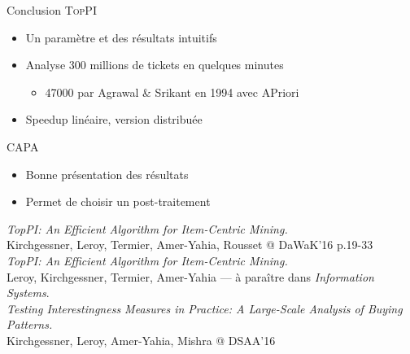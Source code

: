 \documentclass[table]{beamer}
\providecommand{\toppi}{\mbox{\textsc{TopPI}}}
\providecommand{\capa}{\mbox{\textsc{CAPA}} }
\begin{document}
\begin{frame}{Conclusion}
  \toppi
  \begin{itemize}
    \item Un paramètre et des résultats intuitifs
    \item Analyse 300 millions de tickets en quelques minutes
      \begin{itemize}
        \item 47000 par Agrawal \& Srikant en  1994 avec APriori
      \end{itemize}
    \item Speedup linéaire, version distribuée
  \end{itemize}
  \vspace{0.5em}
  \capa
  \begin{itemize}
    \item Bonne présentation des résultats
    \item Permet de choisir un post-traitement
  \end{itemize}
  \vfill
  \begin{footnotesize}
    \setlength{\baselineskip}{-0.5em}
    {\em TopPI: An Efficient Algorithm for Item-Centric Mining.}\\
    Kirchgessner, Leroy, Termier, Amer-Yahia, Rousset @ DaWaK'16 p.19-33 \\
    \medskip
    {\em TopPI: An Efficient Algorithm for Item-Centric Mining.}\\
    Leroy, Kirchgessner, Termier, Amer-Yahia --- à paraître dans {\em Information Systems}.\\
    \medskip
    {\em Testing Interestingness Measures in Practice: A Large-Scale Analysis of Buying Patterns.}\\
    Kirchgessner, Leroy, Amer-Yahia, Mishra @ DSAA'16\\
  \end{footnotesize}
\end{frame}
\end{document}

